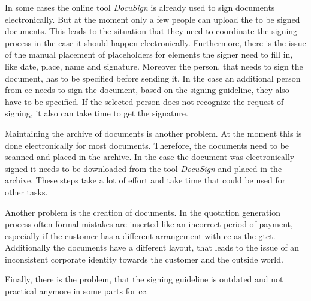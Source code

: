 In some cases the online tool \textit{DocuSign} is already used to sign documents electronically. But at the moment only a few people can upload the to be signed documents. This leads to the situation that they need to coordinate the signing process in the case it should happen electronically. Furthermore, there is the issue of the manual placement of placeholders for elements the signer need to fill in, like date, place, name and signature. Moreover the person, that needs to sign the document, has to be specified before sending it. In the case an additional person from \gls{cc} needs to sign the document, based on the signing guideline, they also have to be specified. If the selected person does not recognize the request of signing, it also can take time to get the signature.

Maintaining the archive of documents is another problem. At the moment this is done electronically for most documents. Therefore, the documents need to be scanned and placed in the archive. In the case the document was electronically signed it needs to be downloaded from the tool \textit{DocuSign} and placed in the archive. These steps take a lot of effort and take time that could be used for other tasks.

Another problem is the creation of documents. In the quotation generation process often formal mistakes are inserted like an incorrect period of payment, especially if the customer has a different arrangement with \gls{cc} as the \gls{gtct}. Additionally the documents have a different layout, that leads to the issue of an inconsistent corporate identity towards the customer and the outside world.

Finally, there is the problem, that the signing guideline is outdated and not practical anymore in some parts for \gls{cc}. 

